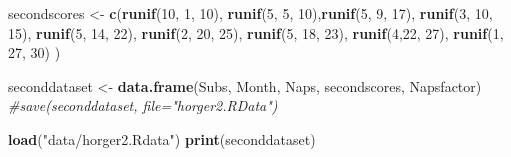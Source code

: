 \documentclass[]{book}
\newenvironment{Shaded}{\begin{snugshade}}{\end{snugshade}}
\newcommand{\CommentTok}[1]{\textcolor[rgb]{0.56,0.35,0.01}{\textit{#1}}}
\newcommand{\DecValTok}[1]{\textcolor[rgb]{0.00,0.00,0.81}{#1}}
\newcommand{\KeywordTok}[1]{\textcolor[rgb]{0.13,0.29,0.53}{\textbf{#1}}}
\newcommand{\NormalTok}[1]{#1}
\newcommand{\StringTok}[1]{\textcolor[rgb]{0.31,0.60,0.02}{#1}}
\begin{document}
\begin{Shaded}
\begin{Highlighting}[]
\NormalTok{secondscores <-}\StringTok{ }\KeywordTok{c}\NormalTok{(}\KeywordTok{runif}\NormalTok{(}\DecValTok{10}\NormalTok{, }\DecValTok{1}\NormalTok{, }\DecValTok{10}\NormalTok{), }\KeywordTok{runif}\NormalTok{(}\DecValTok{5}\NormalTok{, }\DecValTok{5}\NormalTok{, }\DecValTok{10}\NormalTok{),}\KeywordTok{runif}\NormalTok{(}\DecValTok{5}\NormalTok{, }\DecValTok{9}\NormalTok{, }\DecValTok{17}\NormalTok{), }\KeywordTok{runif}\NormalTok{(}\DecValTok{3}\NormalTok{, }\DecValTok{10}\NormalTok{, }\DecValTok{15}\NormalTok{), }\KeywordTok{runif}\NormalTok{(}\DecValTok{5}\NormalTok{, }\DecValTok{14}\NormalTok{, }\DecValTok{22}\NormalTok{), }\KeywordTok{runif}\NormalTok{(}\DecValTok{2}\NormalTok{, }\DecValTok{20}\NormalTok{, }\DecValTok{25}\NormalTok{), }\KeywordTok{runif}\NormalTok{(}\DecValTok{5}\NormalTok{, }\DecValTok{18}\NormalTok{, }\DecValTok{23}\NormalTok{), }\KeywordTok{runif}\NormalTok{(}\DecValTok{4}\NormalTok{,}\DecValTok{22}\NormalTok{, }\DecValTok{27}\NormalTok{), }\KeywordTok{runif}\NormalTok{(}\DecValTok{1}\NormalTok{, }\DecValTok{27}\NormalTok{, }\DecValTok{30}\NormalTok{) )}
\end{Highlighting}
\end{Shaded}

\begin{Shaded}
\begin{Highlighting}[]
\NormalTok{seconddataset <-}\StringTok{ }\KeywordTok{data.frame}\NormalTok{(Subs, Month, Naps, secondscores, Napsfactor)}
\CommentTok{#save(seconddataset, file="horger2.RData")}
\end{Highlighting}
\end{Shaded}

\begin{Shaded}
\begin{Highlighting}[]
\KeywordTok{load}\NormalTok{(}\StringTok{"data/horger2.Rdata"}\NormalTok{)}
\KeywordTok{print}\NormalTok{(seconddataset)}
\end{Highlighting}
\end{Shaded}
\end{document}
